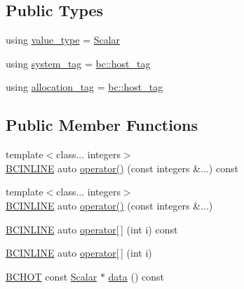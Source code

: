 \subsection*{Public Types}
\begin{DoxyCompactItemize}
\item 
using \hyperlink{structbc_1_1tensors_1_1exprs_1_1Constexpr__Scalar__Constant_3_01Value_00_01Scalar_00_01bc_1_1host__tag_01_4_a12dbfc4ed91541d096589fb838c88725}{value\+\_\+type} = \hyperlink{namespacebc_aa12ac55ee2c43dc082894dd3859daee1}{Scalar}
\item 
using \hyperlink{structbc_1_1tensors_1_1exprs_1_1Constexpr__Scalar__Constant_3_01Value_00_01Scalar_00_01bc_1_1host__tag_01_4_a18d93d053a5c8a800d3797018f0d5e06}{system\+\_\+tag} = \hyperlink{structbc_1_1host__tag}{bc\+::host\+\_\+tag}
\item 
using \hyperlink{structbc_1_1tensors_1_1exprs_1_1Constexpr__Scalar__Constant_3_01Value_00_01Scalar_00_01bc_1_1host__tag_01_4_aa81e090c91ed93bd4cd48557ad82c2d9}{allocation\+\_\+tag} = \hyperlink{structbc_1_1host__tag}{bc\+::host\+\_\+tag}
\end{DoxyCompactItemize}
\subsection*{Public Member Functions}
\begin{DoxyCompactItemize}
\item 
{\footnotesize template$<$class... integers$>$ }\\\hyperlink{common_8h_a6699e8b0449da5c0fafb878e59c1d4b1}{B\+C\+I\+N\+L\+I\+NE} auto \hyperlink{structbc_1_1tensors_1_1exprs_1_1Constexpr__Scalar__Constant_3_01Value_00_01Scalar_00_01bc_1_1host__tag_01_4_a0d61254c0525560e62797530a233d7fd}{operator()} (const integers \&...) const
\item 
{\footnotesize template$<$class... integers$>$ }\\\hyperlink{common_8h_a6699e8b0449da5c0fafb878e59c1d4b1}{B\+C\+I\+N\+L\+I\+NE} auto \hyperlink{structbc_1_1tensors_1_1exprs_1_1Constexpr__Scalar__Constant_3_01Value_00_01Scalar_00_01bc_1_1host__tag_01_4_a0fb55d5e80600e9119f125f3af018c5b}{operator()} (const integers \&...)
\item 
\hyperlink{common_8h_a6699e8b0449da5c0fafb878e59c1d4b1}{B\+C\+I\+N\+L\+I\+NE} auto \hyperlink{structbc_1_1tensors_1_1exprs_1_1Constexpr__Scalar__Constant_3_01Value_00_01Scalar_00_01bc_1_1host__tag_01_4_ad6abb1d18d59b8cfebd2fae1c8d3455e}{operator\mbox{[}$\,$\mbox{]}} (int i) const
\item 
\hyperlink{common_8h_a6699e8b0449da5c0fafb878e59c1d4b1}{B\+C\+I\+N\+L\+I\+NE} auto \hyperlink{structbc_1_1tensors_1_1exprs_1_1Constexpr__Scalar__Constant_3_01Value_00_01Scalar_00_01bc_1_1host__tag_01_4_a0ccf017ef3e4376c1a67fbafa8e09ce2}{operator\mbox{[}$\,$\mbox{]}} (int i)
\item 
\hyperlink{common_8h_ac085f07cc309e3aac24aa3fc0a40f6d2}{B\+C\+H\+OT} const \hyperlink{namespacebc_aa12ac55ee2c43dc082894dd3859daee1}{Scalar} $\ast$ \hyperlink{structbc_1_1tensors_1_1exprs_1_1Constexpr__Scalar__Constant_3_01Value_00_01Scalar_00_01bc_1_1host__tag_01_4_aa54b1a93add44c100995a0facca70cf9}{data} () const
\end{DoxyCompactItemize}
